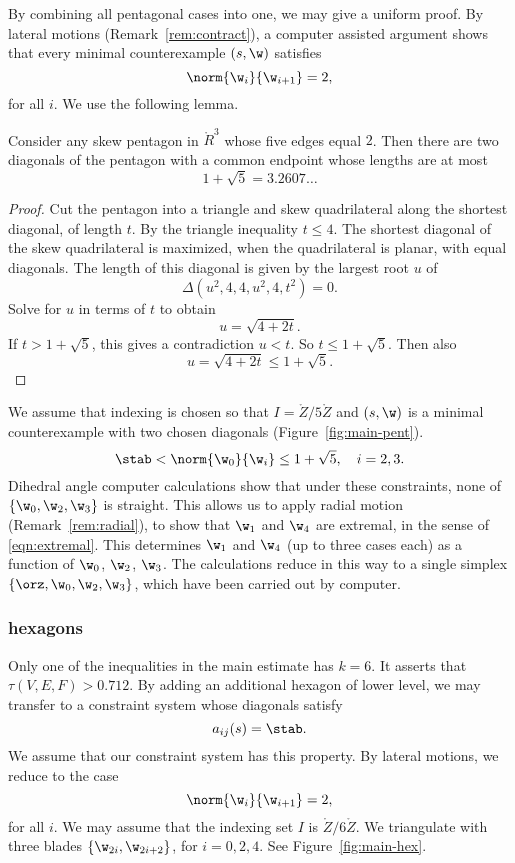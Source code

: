By combining all pentagonal cases into one, we may give a uniform proof.
 By
lateral motions (Remark~\ref{rem:contract}), a computer assisted
argument shows that every minimal counterexample $(s,\w)$ satisfies
\[
\norm{\w_i}{\w_{i+1}} = 2,
\]
for all $i$.  We use the following lemma.

\begin{lemma}
Consider any skew pentagon in $\ring{R}^3$ whose five edges equal $2$.
Then there are two  diagonals  of the pentagon with a common
endpoint whose lengths  are at most
\[
1 + \sqrt{5} = 3.2607\ldots
\]
\end{lemma}

\begin{proof}
  Cut the pentagon into a triangle and skew quadrilateral along the
  shortest diagonal, of length $t$.  By the triangle inequality
  $t\le4$.  The shortest diagonal of the skew quadrilateral is
  maximized, when the quadrilateral is planar, with equal diagonals.
  The length of this diagonal is given by the largest root $u$ of
\[
\Delta(u^2,4,4,u^2,4,t^2)=0.
\]
Solve for $u$ in terms of $t$ to obtain
\[
u = \sqrt{4 + 2 t}.
\]
If $t>1+\sqrt{5}$, this gives a contradiction $u<t$.  
So $t\le 1+\sqrt{5}$.
Then also
\[
u = \sqrt{4 + 2t} \le 1+\sqrt{5}.
\]
\end{proof}

\figLZBQINL %


We assume that indexing is chosen so that $I=\ring{Z}/5\ring{Z}$ and
 $(s,\w)$ is a minimal
counterexample with two chosen diagonals (Figure~\ref{fig:main-pent}).
\[
\stab < \norm{\w_0}{\w_i} \le 1+\sqrt{5},\quad i=2,3.
\]
Dihedral angle computer calculations show that under these
constraints, none of $\{\w_0,\w_2,\w_3\}$ is straight.  This allows
us to apply radial motion (Remark~\ref{rem:radial}), to show that
$\w_1$ and $\w_4$ are extremal, in the sense of \eqref{eqn:extremal}.
This determines $\w_1$ and $\w_4$ (up to three cases each) as a
function of $\w_0$, $\w_2$, $\w_3$.  The calculations reduce in this
way to a single simplex $\{\orz,\w_0,\w_2,\w_3\}$, which have been
carried out by computer.

\subsubsection{hexagons}

Only one of the inequalities in the main estimate has $k=6$.  It
asserts that $\tau(V,E,F) > 0.712$.  By adding an additional hexagon
of lower level, we may transfer to a constraint system whose diagonals
satisfy
\begin{equation}\label{eqn:astab}
a_{ij}(s)=\stab.
\end{equation}  
We assume that our constraint system
has this property.
By lateral motions, we reduce to the case
\[
\norm{\w_i}{\w_{i+1}}=2,
\]
for all $i$.  We may assume that the indexing set $I$ is $\ring{Z}/{6\ring{Z}}$. 
We triangulate with three blades
$\{\w_{2i},\w_{2i+2}\}$, for $i=0,2,4$.  See Figure~\ref{fig:main-hex}.

